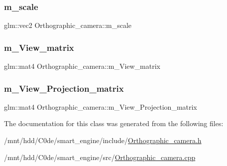 \subsubsection{\texorpdfstring{m\+\_\+scale}{m\_scale}}
{\footnotesize\ttfamily glm\+::vec2 Orthographic\+\_\+camera\+::m\+\_\+scale\hspace{0.3cm}{\ttfamily [private]}}

\mbox{\label{classOrthographic__camera_aadb603c787908e6b7545baa3367dd0bc}} 
\subsubsection{\texorpdfstring{m\+\_\+\+View\+\_\+matrix}{m\_View\_matrix}}
{\footnotesize\ttfamily glm\+::mat4 Orthographic\+\_\+camera\+::m\+\_\+\+View\+\_\+matrix\hspace{0.3cm}{\ttfamily [private]}}

\mbox{\label{classOrthographic__camera_a3826c2d1b6976581f2d3288432f1b62a}} 
\subsubsection{\texorpdfstring{m\+\_\+\+View\+\_\+\+Projection\+\_\+matrix}{m\_View\_Projection\_matrix}}
{\footnotesize\ttfamily glm\+::mat4 Orthographic\+\_\+camera\+::m\+\_\+\+View\+\_\+\+Projection\+\_\+matrix\hspace{0.3cm}{\ttfamily [private]}}



The documentation for this class was generated from the following files\+:\begin{DoxyCompactItemize}
\item 
/mnt/hdd/\+C0de/smart\+\_\+engine/include/\hyperlink{Orthographic__camera_8h}{Orthographic\+\_\+camera.\+h}\item 
/mnt/hdd/\+C0de/smart\+\_\+engine/src/\hyperlink{Orthographic__camera_8cpp}{Orthographic\+\_\+camera.\+cpp}\end{DoxyCompactItemize}

